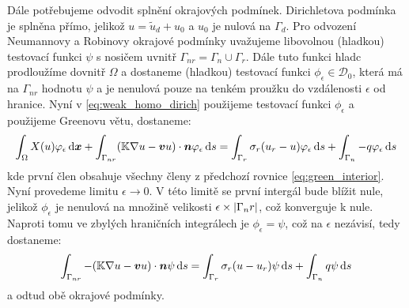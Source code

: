 Dále potřebujeme odvodit splnění okrajových podmínek. Dirichletova podmínka je splněna přímo, jelikož $u=\tilde u_d + u_0$ a $u_0$ je nulová na $\Gamma_d$.
Pro odvození Neumannovy a Robinovy okrajové podmínky uvažujeme libovolnou (hladkou) testovací funkci $\psi$ s nosičem uvnitř $\Gamma_{nr} =\Gamma_n \cup \Gamma_r$. 
Dále tuto funkci hladc prodloužíme dovnitř  $\Omega$ a dostaneme  (hladkou) testovací funkci $\phi_\epsilon \in \mathcal D_0$, která má na 
$\Gamma_{nr}$ hodnotu $\psi$ a je nenulová pouze na tenkém proužku do vzdálenosti $\epsilon$ od hranice.
Nyní v \eqref{eq:weak_homo_dirich} použijeme testovací funkci $\phi_\epsilon$ a použijeme Greenovu větu, dostaneme:
\[
    \int_\Omega X(u)\varphi_\epsilon \,{\rm d} \mathbf{\boldsymbol{x}} + \int_{\Gamma_{nr}} ({\mathbb{K}}\nabla u-\mathbf{\boldsymbol{v}} u)\cdot \mathbf{\boldsymbol{n}} \varphi_\epsilon \,{\rm d} s    
              =  \int_{\Gamma_r} \sigma_r (u_r -u) \varphi_\epsilon \,{\rm d} s + \int_{\Gamma_n} -q \varphi_\epsilon \,{\rm d} s 
\]
kde první člen obsahuje všechny členy z předchozí rovnice \eqref{eq:green_interior}. Nyní provedeme limitu $\epsilon \to 0$. V této limitě se první intergál 
bude blížit nule, jelikož $\phi_\epsilon$ je nenulová na množině velikosti $\epsilon \times \lvert\Gamma_nr\rvert$, což konverguje k nule. Naproti tomu ve zbylých 
hraničních integrálech je $\phi_\epsilon = \psi$, což na $\epsilon$ nezávisí, tedy dostaneme:
\[
    \int_{\Gamma_{nr}} -({\mathbb{K}}\nabla u-\mathbf{\boldsymbol{v}} u)\cdot \mathbf{\boldsymbol{n}} \psi \,{\rm d} s  
              =  \int_{\Gamma_r} \sigma_r (u -u_r) \psi \,{\rm d} s + \int_{\Gamma_n} q \psi \,{\rm d} s 
\]
a odtud obě okrajové podmínky.





